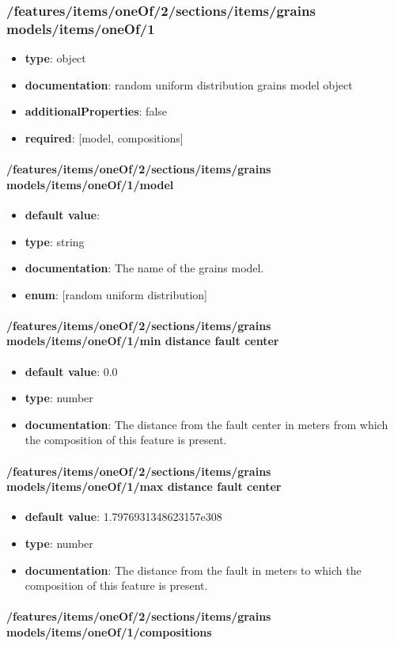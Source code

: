 \subsubsection{/features/items/oneOf/2/sections/items/grains models/items/oneOf/1}
\begin{itemize}\item {\bf type}: object
\item {\bf documentation}: random uniform distribution grains model object
\item {\bf additionalProperties}: false
\item {\bf required}: [model, compositions]\end{itemize}
\paragraph{/features/items/oneOf/2/sections/items/grains models/items/oneOf/1/model}
\begin{itemize}\item {\bf default value}: 
\item {\bf type}: string
\item {\bf documentation}: The name of the grains model.
\item {\bf enum}: [random uniform distribution]\end{itemize}\paragraph{/features/items/oneOf/2/sections/items/grains models/items/oneOf/1/min distance fault center}
\begin{itemize}\item {\bf default value}: 0.0
\item {\bf type}: number
\item {\bf documentation}: The distance from the fault center in meters from which the composition of this feature is present.
\end{itemize}\paragraph{/features/items/oneOf/2/sections/items/grains models/items/oneOf/1/max distance fault center}
\begin{itemize}\item {\bf default value}: 1.7976931348623157e308
\item {\bf type}: number
\item {\bf documentation}: The distance from the fault in meters to which the composition of this feature is present.
\end{itemize}\paragraph{/features/items/oneOf/2/sections/items/grains models/items/oneOf/1/compositions}
